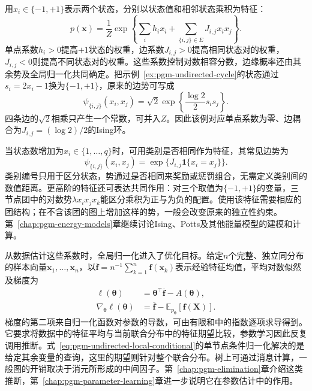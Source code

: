 用$x_i\in\{-1,+1\}$表示两个状态，分别以状态值和相邻状态乘积为特征：
\begin{equation}
  p(\bm{x})=\frac{1}{Z}
  \exp\left\{\sum_i h_i x_i+
             \sum_{\{i,j\}\in E}J_{i,j}x_i x_j\right\}.
  \label{eq:pgm-undirected-ising}
\end{equation}
单点系数$h_i>0$提高$+1$状态的权重，边系数$J_{i,j}>0$提高相同状态对的权重，$J_{i,j}<0$则提高不同状态对的权重。这些系数控制对数相容分数，边缘概率还由其余势及全局归一化共同确定。把示例~\ref{ex:pgm-undirected-cycle}的状态通过$s_i=2x_i-1$换为$\{-1,+1\}$，原来的边势可写成
\[
  \psi_{\{i,j\}}(x_i,x_j)
  =\sqrt{2}\exp\left\{\frac{\log2}{2}s_i s_j\right\}.
\]
四条边的$\sqrt{2}$相乘只产生一个常数，可并入$Z$。因此该例对应单点系数为零、边耦合为$J_{i,j}=(\log2)/2$的Ising环。

当状态数增加为$x_i\in\{1,\ldots,q\}$时，可用类别是否相同作为特征，其常见边势为
\[
  \psi_{\{i,j\}}(x_i,x_j)
  =\exp\{J_{i,j}\mathbf{1}\{x_i=x_j\}\}.
\]
类别编号只用于区分状态，势通过是否相同来奖励或惩罚组合，无需定义类别间的数值距离。更高阶的特征还可表达共同作用：对三个取值为$\{-1,+1\}$的变量，三节点团中的对数势$\lambda x_i x_j x_k$能区分乘积为正与为负的配置。使用该特征需要相应的团结构；在不含该团的图上增加这样的势，一般会改变原来的独立性约束。第~\ref{chap:pgm-energy-models}章继续讨论Ising、Potts及其他能量模型的建模和计算。

从数据估计这些系数时，全局归一化进入了优化目标。给定$n$个完整、独立同分布的样本向量$\bm{x}_1,\ldots,\bm{x}_n$，以$\overline{\bm{f}}=n^{-1}\sum_{k=1}^n\bm{f}(\bm{x}_k)$表示经验特征均值，平均对数似然及梯度为
\begin{equation}
  \begin{aligned}
    \ell(\bm{\theta})
      &=\bm{\theta}^{\top}\overline{\bm{f}}-A(\bm{\theta}),\\
    \nabla_{\bm{\theta}}\ell(\bm{\theta})
      &=\overline{\bm{f}}
        -\mathbb{E}_{p_{\bm{\theta}}}[\bm{f}(\bm{X})].
  \end{aligned}
  \label{eq:pgm-undirected-learning-gradient}
\end{equation}
梯度的第二项来自归一化函数对参数的导数，可由有限和中的指数逐项求导得到。它要求将数据中的特征平均与当前联合分布中的特征期望比较，参数学习因此反复调用推断。式~\eqref{eq:pgm-undirected-local-conditional}的单节点条件归一化解决的是给定其余变量的查询，这里的期望则针对整个联合分布。树上可通过消息计算，一般图的开销取决于消元所形成的中间因子。第~\ref{chap:pgm-elimination}章介绍这类推断，第~\ref{chap:pgm-parameter-learning}章进一步说明它在参数估计中的作用。

